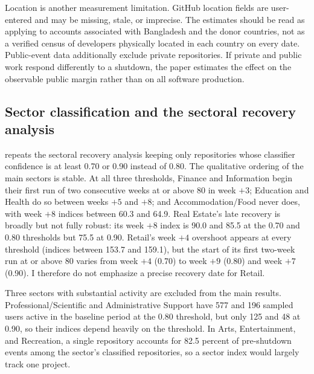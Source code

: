 Location is another measurement limitation. GitHub location fields are user-entered and may be missing, stale, or imprecise. The estimates should be read as applying to accounts associated with Bangladesh and the donor countries, not as a verified census of developers physically located in each country on every date. Public-event data additionally exclude private repositories. If private and public work respond differently to a shutdown, the paper estimates the effect on the observable public margin rather than on all software production.

\subsection{Sector classification and the sectoral recovery analysis}
\label{sec:sector_robustness}

 repeats the sectoral recovery analysis keeping only repositories whose classifier confidence is at least 0.70 or 0.90 instead of 0.80. The qualitative ordering of the main sectors is stable. At all three thresholds, Finance and Information begin their first run of two consecutive weeks at or above 80 in week $+3$; Education and Health do so between weeks $+5$ and $+8$; and Accommodation/Food never does, with week $+8$ indices between 60.3 and 64.9. Real Estate's late recovery is broadly but not fully robust: its week $+8$ index is 90.0 and 85.5 at the 0.70 and 0.80 thresholds but 75.5 at 0.90. Retail's week $+4$ overshoot appears at every threshold (indices between 153.7 and 159.1), but the start of its first two-week run at or above 80 varies from week $+4$ (0.70) to week $+9$ (0.80) and week $+7$ (0.90). I therefore do not emphasize a precise recovery date for Retail.

Three sectors with substantial activity are excluded from the main results. Professional/\allowbreak Scientific and Administrative Support have 577 and 196 sampled users active in the baseline period at the 0.80 threshold, but only 125 and 48 at 0.90, so their indices depend heavily on the threshold. In Arts, Entertainment, and Recreation, a single repository accounts for 82.5 percent of pre-shutdown events among the sector's classified repositories, so a sector index would largely track one project.

